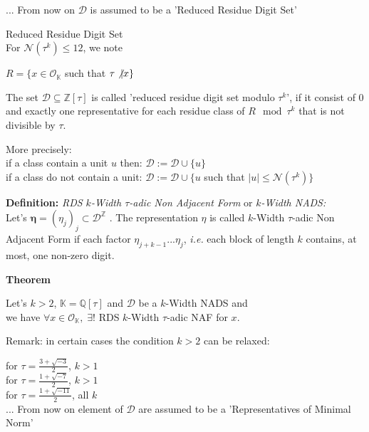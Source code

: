 \begin{itemize}
... From now on $\mathcal{D}$ is assumed to be a 'Reduced Residue Digit Set' \\
\raggedright
	\begin{mydef}{Reduced Residue Digit Set}\\
		For $\mathcal{N}(\tau^k) \leq 12$, we note 
		\begin{center}
		$R = \{x \in \mathcal{O}_\mathbb{K}$ such that $\tau \not\vert x \}$
		\end{center}
		The set $\mathcal{D} \subseteq \mathbb{Z}[\tau]$ is called 
		'reduced residue digit set modulo $\tau^k$', 
		if it consist of $0$ and exactly one representative for each 
		residue class of $R \mod \tau^k$ that is not divisible by $\tau$.
		
		More precisely:\\ 
		if a class contain a unit $u$ then: 
		$\mathcal{D} := \mathcal{D} \cup \{u\}$\\
		if a class do not contain a unit: 
		$\mathcal{D} := \mathcal{D} \cup \{u$ such that $ |u|\leq \mathcal{N}(\tau^k) \}$\\
	\end{mydef}
\vspace{5mm}


\textbf{Definition:} 
\textit{RDS $k$-Width $\tau$-adic Non Adjacent Form} 
or  
\textit{$k$-Width NADS:}
\\
Let's  $\mathbf{\eta}=(\eta_j)_{j} \subset \mathcal{D}^\mathbb{Z}$ .
The representation $ \eta $ is called $k$-Width $\tau$-adic Non Adjacent Form
if each factor $\eta_{j+k-1}...\eta_{j}$, \textit{i.e.} each block of length $k$
contains, at most, one non-zero digit.
\vspace{5mm}

\textbf{Theorem} 
\begin{center}
	Let's $k>2$, $\mathbb{K}=\mathbb{Q}[\tau]$ and  $\mathcal{D}$ 
	be a $k$-Width NADS and  \\
	we have $\forall x \in \mathcal{O}_\mathbb{K}, \; \exists ! $ 
	RDS $k$-Width $\tau$-adic NAF for $x$.
\end{center}

Remark: in certain cases the condition $k>2$ can be relaxed:

for $ \tau = \frac{3+\sqrt{-3}}{2}$, $k>1$\\
for $ \tau = \frac{1+\sqrt{-7}}{2}$, $k>1$\\
for $ \tau = \frac{1+\sqrt{-11}}{2}$, all $k$ \\

\newpage
\raggedleft 
... From now on element of $\mathcal{D}$ are assumed to be a
'Representatives of Minimal Norm' \\


\end{itemize}
